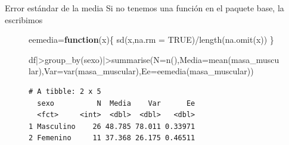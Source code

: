 \documentclass[
  ignorenonframetext,
]{beamer}
\newenvironment{Shaded}{\begin{snugshade}}{\end{snugshade}}
\newcommand{\AttributeTok}[1]{\textcolor[rgb]{0.40,0.45,0.13}{#1}}
\newcommand{\ConstantTok}[1]{\textcolor[rgb]{0.56,0.35,0.01}{#1}}
\newcommand{\ControlFlowTok}[1]{\textcolor[rgb]{0.00,0.23,0.31}{\textbf{#1}}}
\newcommand{\FunctionTok}[1]{\textcolor[rgb]{0.28,0.35,0.67}{#1}}
\newcommand{\NormalTok}[1]{\textcolor[rgb]{0.00,0.23,0.31}{#1}}
\newcommand{\OtherTok}[1]{\textcolor[rgb]{0.00,0.23,0.31}{#1}}
\newcommand{\SpecialCharTok}[1]{\textcolor[rgb]{0.37,0.37,0.37}{#1}}
\begin{document}
\begin{frame}[fragile]{Error estándar de la media}
\label{error-estuxe1ndar-de-la-media-1}
Si no tenemos una función en el paquete base, la escribimos

\begin{figure}

\begin{Shaded}
\begin{Highlighting}[]
\NormalTok{eemedia}\OtherTok{=}\ControlFlowTok{function}\NormalTok{(x)\{}
  \FunctionTok{sd}\NormalTok{(x,}\AttributeTok{na.rm =} \ConstantTok{TRUE}\NormalTok{)}\SpecialCharTok{/}\FunctionTok{length}\NormalTok{(}\FunctionTok{na.omit}\NormalTok{(x)) }
\NormalTok{\}}
\end{Highlighting}
\end{Shaded}

\end{figure}%

\begin{figure}

\begin{Shaded}
\begin{Highlighting}[]
\NormalTok{df}\SpecialCharTok{|\textgreater{}}\FunctionTok{group\_by}\NormalTok{(sexo)}\SpecialCharTok{|\textgreater{}}\FunctionTok{summarise}\NormalTok{(}\AttributeTok{N=}\FunctionTok{n}\NormalTok{(),}\AttributeTok{Media=}\FunctionTok{mean}\NormalTok{(masa\_muscular),}\AttributeTok{Var=}\FunctionTok{var}\NormalTok{(masa\_muscular),}\AttributeTok{Ee=}\FunctionTok{eemedia}\NormalTok{(masa\_muscular))  }
\end{Highlighting}
\end{Shaded}

\begin{verbatim}
# A tibble: 2 x 5
  sexo          N  Media    Var      Ee
  <fct>     <int>  <dbl>  <dbl>   <dbl>
1 Masculino    26 48.785 78.011 0.33971
2 Femenino     11 37.368 26.175 0.46511
\end{verbatim}

\end{figure}%
\end{frame}
\end{document}
